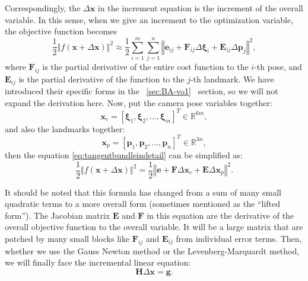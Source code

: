 Correspondingly, the $\Delta \mathbf{x}$ in the increment equation is the increment of the overall variable. In this sense, when we give an increment to the optimization variable, the objective function becomes
\begin{equation}
	\label{eq:tangentbundleindetail}
	\frac{1}{2}\left\Vert f(\mathbf{x} + \Delta \mathbf{x}) \right\Vert ^2 \approx \frac{1}{2}\sum_{i=1}^{m}\sum_{j=1}^n \left\Vert \mathbf{e}_{ij} + \mathbf{F}_{ij} \Delta \mathbf{\xi}_{i} + \mathbf{E}_{ij} \Delta \mathbf{p}_j \right\Vert^2,
\end{equation}
where $\mathbf{F}_{ij}$ is the partial derivative of the entire cost function to the $i$-th pose, and $\mathbf{E}_{ij}$ is the partial derivative of the function to the $j$-th landmark. We have introduced their specific forms in the ~\ref{sec:BA-vo1}~ section, so we will not expand the derivation here. Now, put the camera pose variables together:
\begin{equation}
	\mathbf{x}_c=[ \mathbf{\xi}_1, \mathbf{\xi}_2, \ldots, \mathbf{\xi}_m ]^T \in \mathbb{R}^{6m},
\end{equation}
and also the landmarks together: 
\begin{equation}
	\mathbf{x}_p=[ \mathbf{p}_1, \mathbf{p}_2, \ldots , \mathbf{p}_n ]^T\in \mathbb{R}^{3n},
\end{equation}
then the equation \eqref{eq:tangentbundleindetail} can be simplified as: 
\begin{equation}
	\label{eq:BAleastsquare}
	\frac{1}{2}
	\left\Vert 
	f(\mathbf{x}+ \Delta \mathbf{x} )
	\right\Vert ^2 = 
	\frac{1}{2} 
	\left\Vert 
	\mathbf{e} + \mathbf{F}\Delta \mathbf{x}_c + \mathbf{E} \Delta \mathbf{x}_p 
	\right \Vert ^2 .
\end{equation}

It should be noted that this formula has changed from a sum of many small quadratic terms to a more overall form (sometimes mentioned as the ``lifted form''). The Jacobian matrix $\mathbf{E}$ and $\mathbf{F}$ in this equation are the derivative of the overall objective function to the overall variable. It will be a large matrix that are patched by many small blocks like $\mathbf{F}_{ij}$ and $\mathbf{E}_{ij}$ from individual error terms. Then, whether we use the Gauss Newton method or the Levenberg-Marquardt method, we will finally face the incremental linear equation:
\begin{equation}
	\mathbf{H} \Delta \mathbf{x} = \mathbf{g}.
\end{equation}

